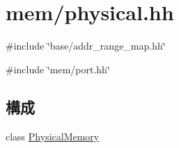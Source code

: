 \hypertarget{physical_8hh}{
\section{mem/physical.hh}
\label{physical_8hh}
}
{\ttfamily \#include \char`\"{}base/addr\_\-range\_\-map.hh\char`\"{}}\par
{\ttfamily \#include \char`\"{}mem/port.hh\char`\"{}}\par
\subsection*{構成}
\begin{DoxyCompactItemize}
\item 
class \hyperlink{classPhysicalMemory}{PhysicalMemory}
\end{DoxyCompactItemize}

